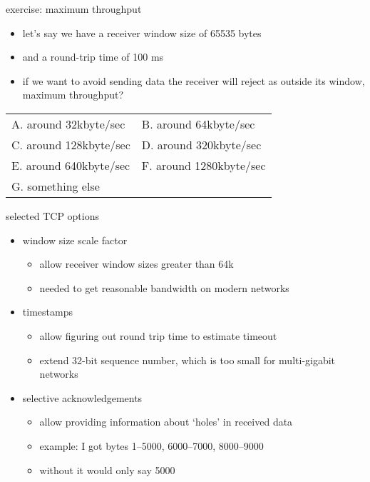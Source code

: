 \begin{frame}{exercise: maximum throughput}
    \begin{itemize}
    \item let's say we have a receiver window size of 65535 bytes
    \item and a round-trip time of 100 ms
    \vspace{.5cm}
    \item if we want to avoid sending data the receiver will reject as outside
    its window, maximum throughput?
    \end{itemize}
\begin{tabular}{ll}
A. around 32kbyte/sec &
B. around 64kbyte/sec \\
C. around 128kbyte/sec &
D. around 320kbyte/sec \\
E. around 640kbyte/sec &
F. around 1280kbyte/sec \\
G. something else \\
\end{tabular}
\end{frame}

\begin{frame}{selected TCP options}
    \begin{itemize}
    \item window size scale factor
        \begin{itemize}
        \item allow receiver window sizes greater than 64k
        \item needed to get reasonable bandwidth on modern networks
        \end{itemize}
    \item timestamps
        \begin{itemize}
        \item allow figuring out round trip time to estimate timeout
        \item extend 32-bit sequence number, which is too small for multi-gigabit networks
        \end{itemize}
    \item selective acknowledgements
        \begin{itemize}
        \item allow providing information about `holes' in received data
        \item example: I got bytes 1--5000, 6000--7000, 8000--9000
        \item without it would only say 5000
        \end{itemize}
    \end{itemize}
\end{frame}

